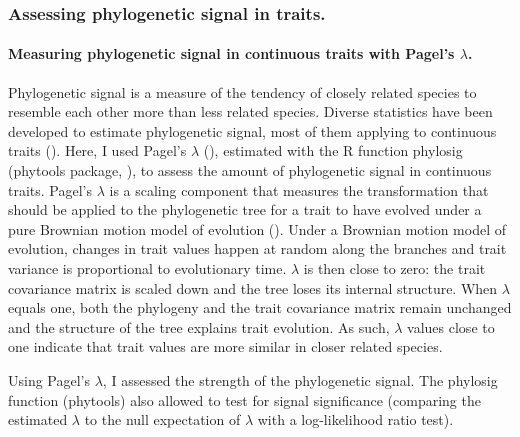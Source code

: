 \subsubsection{Assessing phylogenetic signal in traits.}

\paragraph{Measuring phylogenetic signal in continuous traits with Pagel's $\lambda$.}
Phylogenetic signal is a measure of the tendency of closely related species to resemble each other more than less related species. Diverse statistics have been developed to estimate phylogenetic signal, most of them applying to continuous traits (\cite{Munkemuller2012}). Here, I used Pagel's $\lambda$ (\cite{Pagel1999}), estimated with the R function phylosig (phytools package, \cite{Revell2016}), to assess the amount of phylogenetic signal in continuous traits. Pagel's $\lambda$ is a scaling component that measures the transformation that should be applied to the phylogenetic tree for a trait to have evolved under a pure Brownian motion model of evolution (\cite{Munkemuller2012}). Under a Brownian motion model of evolution, changes in trait values happen at random along the branches and trait variance is proportional to evolutionary time.  $\lambda$ is then close to zero: the trait covariance matrix is scaled down and the tree loses its internal structure. When $\lambda$ equals one, both the phylogeny and the trait covariance matrix remain unchanged and the structure of the tree explains trait evolution. As such, $\lambda$ values close to one indicate that trait values are more similar in closer related species.  

Using Pagel's $\lambda$, I assessed the strength of the phylogenetic signal. The phylosig function (phytools) also allowed to test for signal significance (comparing the estimated $\lambda$ to the null expectation of $\lambda$ with a log-likelihood ratio test). 

